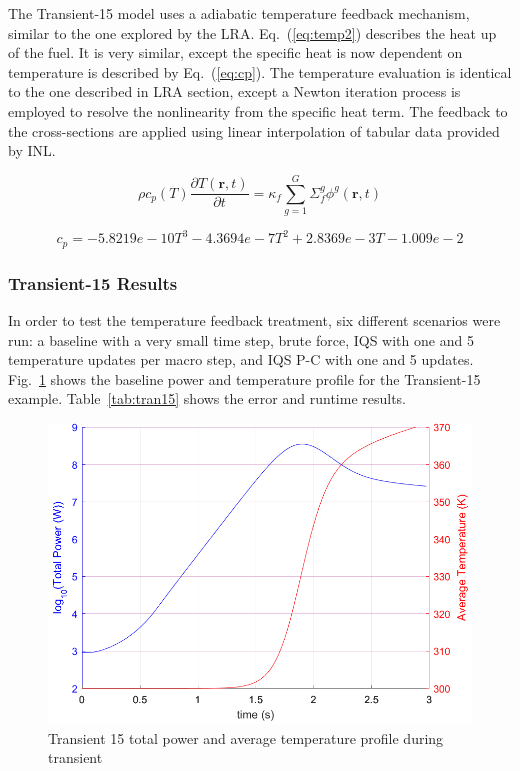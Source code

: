 \documentclass{anstrans}
\renewcommand{\vec}[1]{\bm{#1}} %
\newcommand{\eqt}[1]{Eq.~(\ref{#1})}                     %
\newcommand{\fig}[1]{Fig.~\ref{#1}}                      %
\newcommand{\tbl}[1]{Table~\ref{#1}}                     %
\newcommand{\be}{\begin{equation}}
\newcommand{\ee}{\end{equation}}
\begin{document}
The Transient-15 model uses a adiabatic temperature feedback mechanism, similar to the one explored by the LRA. \eqt{eq:temp2} describes the heat up of the fuel.  It is very similar, except the specific heat is now dependent on temperature is described by \eqt{eq:cp}.  The temperature evaluation is identical to the one described in LRA section, except a Newton iteration process is employed to resolve the nonlinearity from the specific heat term.  The feedback to the cross-sections are applied using linear interpolation of tabular data provided by INL.

\be
\rho c_p(T) \frac{\partial T(\vec{r},t)}{\partial t} = \kappa_f \sum^G_{g=1}\Sigma_f^g \phi^g(\vec{r},t)
\label{eq:temp2}
\ee

\be
c_p = -5.8219e-10T^3 - 4.3694e-7T^2 + 2.8369e-3T -1.009e-2
\label{eq:cp}
\ee

\subsubsection{Transient-15 Results}

In order to test the temperature feedback treatment, six different scenarios were run: a baseline with a very small time step, brute force, IQS with one and 5 temperature updates per macro step, and IQS P-C with one and 5 updates.  \fig{fig:Tran15_profile} shows the baseline power and temperature profile for the Transient-15 example.  \tbl{tab:tran15} shows the error and runtime results.

\begin{figure}[htbp!]
\centering
\includegraphics[width=\linewidth]{Tran15_profile.png}
\caption{Transient 15 total power and average temperature profile during transient}
\label{fig:Tran15_profile}
\end{figure}
\end{document}

